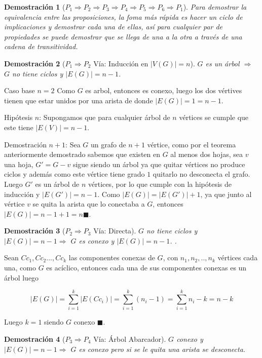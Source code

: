 \documentclass[a4paper,1pt]{report}
\newtheorem*{dem}{Demostración}
\begin{document}
\begin{dem}[$P_1 \Rightarrow P_2 \Rightarrow P_3 \Rightarrow P_4 \Rightarrow P_5 \Rightarrow P_6 \Rightarrow P_1$]
    Para demostrar la equivalencia entre las proposiciones, la foma m\'as r\'apida es hacer un ciclo de implicaciones y demostrar cada una de ellas, as\'i para cualquier par de propiedades se puede demostrar que se llega de una a la otra a trav\'es de una cadena de transitividad.
\end{dem}
\begin{dem}[$P_1 \Rightarrow P_2$ V\'ia: Inducci\'on en $|V(G)| = n$] $G$ es un \'arbol $\Rightarrow$ $G$ no tiene ciclos y $|E(G)| = n-1$.\end{dem}

Caso base $n = 2$ Como $G$ es arbol, entonces es conexo, luego los dos v\'ertives tienen que estar unidos por una arista de donde $|E(G)| = 1 = n-1$.

Hip\'otesis $n$: Supongamos que para cualquier \'arbol de $n$ v\'ertices se cumple que este tiene $|E(V)| = n -1$.

Demostración $n+1$: Sea $G$ un grafo de $n+1$ v\'ertice, como por el teorema anteriormente demostrado sabemos que existen en $G$ al menos dos hojas, sea $v$ una hoja, $G' = G - v$ sigue siendo un \'arbol ya que quitar v\'ertices no produce ciclos y adem\'as como este v\'ertice tiene grado $1$ quitarlo no desconecta el grafo. Luego $G'$ es un \'arbol de $n$ v\'ertices, por lo que cumple con la hip\'otesis de inducci\'on y $|E(G')| = n-1$. Como $|E(G)| = |E(G')| +1$, ya que junto al v\'ertice $v$ se quita la arista que lo conectaba a $G$, entonces $|E(G)| = n-1+1 = n \blacksquare$.

\begin{dem}[$P_2 \Rightarrow P_3$ V\'ia: Directa] $G$ no tiene ciclos y $|E(G)| = n-1 \Rightarrow$ $G$ es conexo y $|E(G)| = n-1$. .\end{dem}

Sean $Cc_1, Cc_2..., Cc_k$ las componentes conexas de $G$, con $n_1, n_2,.., n_k$ v\'ertices cada una,  como $G$ es ac\'iclico, entonces cada una de sus componentes conexas es un \'arbol luego 

$$ |E(G)| = \sum_{i = 1}^{k} |E(Cc_i)| = \sum_{i =1}^{k} (n_i -1) = \sum_{i =1}^{k} n_i -k = n -k$$

Luego $k = 1$ siendo $G$ conexo $\blacksquare$.

\begin{dem}[$P_3 \Rightarrow P_4$ V\'ia: \'Arbol Abarcador] $G$ conexo y $|E(G)| = n-1 \Rightarrow$ $G$ es conexo pero si se le quita una arista se desconecta.\end{dem}
\end{document}
